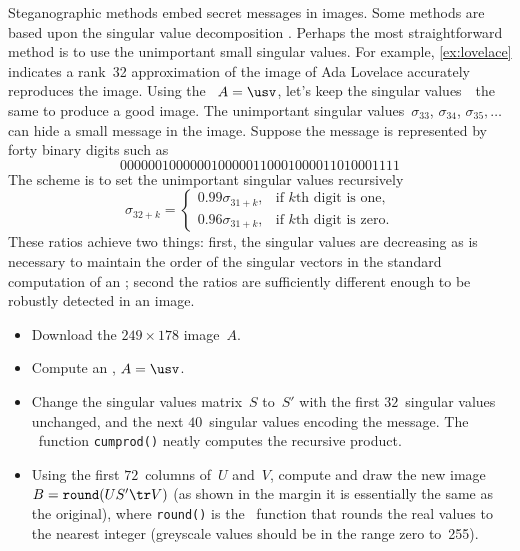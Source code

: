\begin{exercise} \label{ex:} 
 Steganographic methods embed secret messages in images.
Some methods are based upon the singular value decomposition \cite[e.g.]{Gorodetski2001}. %
Perhaps the most straightforward method is to use the unimportant small singular values.
For example, \autoref{ex:lovelace} indicates a rank~32 approximation of the image of Ada Lovelace accurately reproduces the image.
Using the \svd\ \(A=\usv\), let's keep the singular values~\hlist{}\ the same to produce a good image.
The unimportant singular values~\(\sigma_{33}\), \(\sigma_{34}\), \(\sigma_{35},\ldots\) can hide a small message in the image.
Suppose the message is represented by forty binary digits such as
\begin{equation*}
0000001000000100000110001000011010001111
\end{equation*}
The scheme is to set the unimportant singular values recursively
\begin{equation*}
\sigma_{32+k}=\begin{cases}0.99\sigma_{31+k},
&\text{if \(k\)th digit is one},
\\0.96\sigma_{31+k},
&\text{if \(k\)th digit is zero}.
\end{cases}
\end{equation*}
These ratios achieve two things: first, the singular values are decreasing as is necessary to maintain the order of the singular vectors in the standard computation of an \svd; second the ratios are sufficiently different enough to be robustly detected in an image.
\begin{itemize}
\item Download the \(249\times178\) image~\(A\).

\item Compute an \svd, \(A=\usv\).

\item Change the singular values matrix~\(S\) to~\(S'\) with the first \(32\)~singular values unchanged, and the next \(40\)~singular values encoding the message.
The \script\ function \verb|cumprod()| neatly computes the recursive product.

\item Using the first \(72\)~columns of~\(U\) and~\(V\), compute and draw the new image \(B=\verb|round|(US'\tr V)\) (as shown in the margin it is essentially the same as the original),
%
where \verb|round()| is the \script\ function that rounds the real values to the nearest integer (greyscale values should be in the range zero to~255). 


\end{itemize}
\end{exercise}
